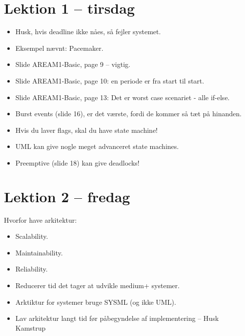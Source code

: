 \documentclass{article}
\begin{document}
\section{Lektion 1 -- tirsdag}

\begin{itemize}
	\item Husk, hvis deadline ikke nåes, så fejler systemet.
	\item[] Eksempel nævnt: Pacemaker.
	\item Slide AREAM1-Basic, page 9 -- vigtig.
	\item Slide AREAM1-Basic, page 10: en periode er fra start til start.
	\item Slide AREAM1-Basic, page 13: Det er worst case scenariet - alle if-else.
	\item Burst events (slide 16), er det værste, fordi de kommer så tæt på hinanden.
	\item Hvis du laver flags, skal du have state machine!
	\item UML kan give nogle meget advanceret state machines.
	\item Preemptive (slide 18) kan give deadlocks!
\end{itemize}



\section{Lektion 2 -- fredag}

Hvorfor have arkitektur:
\begin{itemize}
	\item Scalability.
	\item Maintainability.
	\item Reliability.
	\item Reducerer tid det tager at udvikle medium+ systemer.
	\item Arktiktur for systemer bruge SYSML (og ikke UML).
	\item Lav arkitektur langt tid før påbegyndelse af implementering -- Husk Kamstrup
\end{itemize}
\end{document}
